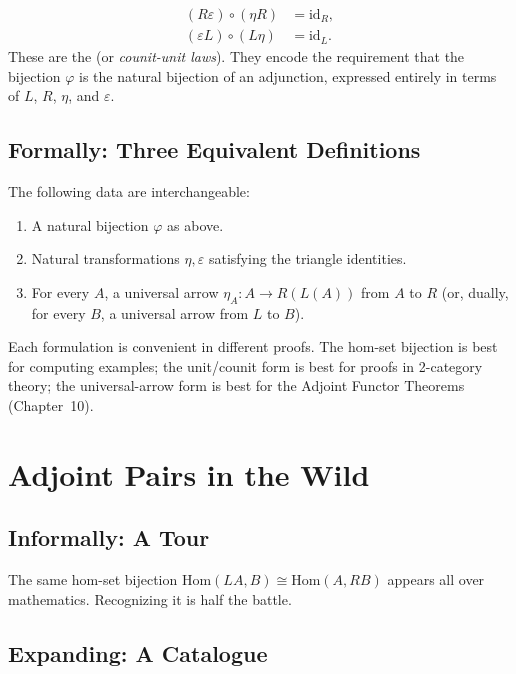 \begin{align*}
  (R \varepsilon) \circ (\eta R) &= \mathrm{id}_R, \\
  (\varepsilon L) \circ (L \eta) &= \mathrm{id}_L.
\end{align*}
These are the  (or \emph{counit-unit laws}).
They encode the requirement that the bijection $\varphi$ is the natural
bijection of an adjunction, expressed entirely in terms of $L$, $R$,
$\eta$, and $\varepsilon$.

\subsection{Formally: Three Equivalent Definitions}

The following data are interchangeable:
\begin{enumerate}
  \item A natural bijection $\varphi$ as above.
  \item Natural transformations $\eta, \varepsilon$ satisfying the
        triangle identities.
  \item For every $A$, a universal arrow $\eta_A : A \to R(L(A))$ from
        $A$ to $R$ (or, dually, for every $B$, a universal arrow from
        $L$ to $B$).
\end{enumerate}
Each formulation is convenient in different proofs. The hom-set bijection
is best for computing examples; the unit/counit form is best for proofs
in 2-category theory; the universal-arrow form is best for the Adjoint
Functor Theorems (Chapter~10).


\section{Adjoint Pairs in the Wild}
\label{sec:adjoints-in-wild}

\subsection{Informally: A Tour}

The same hom-set bijection $\mathrm{Hom}(L A, B) \cong \mathrm{Hom}(A, R B)$
appears all over mathematics. Recognizing it is half the battle.

\subsection{Expanding: A Catalogue}

